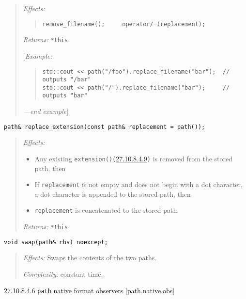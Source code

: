 \begin{quote}
\emph{Effects:}

\begin{quote}
\texttt{remove\_filename();\ \ \ \ \ operator/=(replacement);}
\end{quote}

\emph{Returns:} \texttt{*this}.

{[}\emph{Example:}

\begin{quote}
\begin{verbatim}
std::cout << path("/foo").replace_filename("bar");  // outputs "/bar"
std::cout << path("/").replace_filename("bar");     // outputs "bar"
\end{verbatim}
\end{quote}

\emph{---end example}{]}
\end{quote}

\begin{verbatim}
path& replace_extension(const path& replacement = path());
\end{verbatim}

\begin{quote}
\emph{Effects:}

\begin{itemize}
\tightlist
\item
  Any existing
  \texttt{extension()(}\hyperref[path.decompose]{27.10.8.4.9}\texttt{)}
  is removed from the stored path, then
\item
  If \texttt{replacement} is not empty and does not begin with a dot
  character, a dot character is appended to the stored path, then
\item
  \texttt{replacement} is concatenated to the stored path.
\end{itemize}

\emph{Returns:} \texttt{*this}
\end{quote}

\begin{verbatim}
void swap(path& rhs) noexcept;
\end{verbatim}

\begin{quote}
\emph{Effects:} Swaps the contents of the two paths.

\emph{Complexity:} constant time.
\end{quote}

27.10.8.4.6 \texttt{path} native format observers {[}path.native.obs{]}

